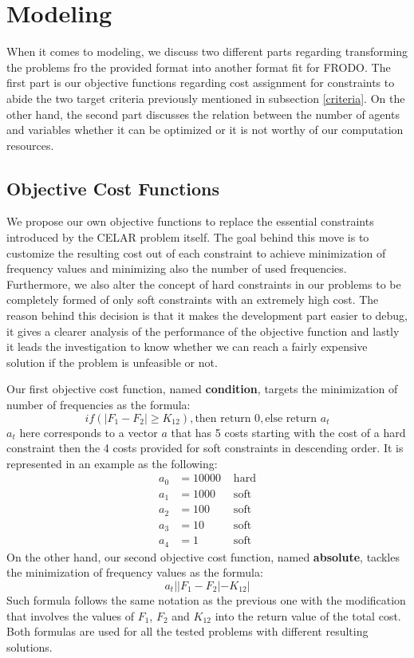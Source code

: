 \documentclass{article}
\begin{document}
	\section{Modeling}
	When it comes to modeling, we discuss two different parts regarding transforming the problems fro the provided format into another format fit for FRODO. The first part is our objective functions regarding cost assignment for constraints to abide the two target criteria previously mentioned in subsection \ref{criteria}. On the other hand, the second part discusses the relation between the number of agents and variables whether it can be optimized or it is not worthy of our computation resources.
	\subsection{Objective Cost Functions}\label{costfun}
	We propose our own objective functions to replace the essential constraints introduced by the CELAR problem itself. The goal behind this move is to customize the resulting cost out of each constraint to achieve minimization of frequency values and minimizing also the number of used frequencies. Furthermore, we also alter the concept of hard constraints in our problems to be completely formed of only soft constraints with an extremely high cost. The reason behind this decision is that it makes the development part easier to debug, it gives a clearer analysis of the performance of the objective function and lastly it leads the investigation to know whether we can reach a fairly expensive solution if the problem is unfeasible or not.
	
	Our first objective cost function, named \textbf{condition}, targets the minimization of number of frequencies as the formula:
	\[if(|F_1 - F_2| \geq K_{12}), \text{then return 0}, \text{else return } a_t\]
	$a_t$ here corresponds to a vector $a$ that has 5 costs starting with the cost of a hard constraint then the 4 costs provided for soft constraints in descending order. It is represented in an example as the following:
	\begin{align}
		a_0 &= 10000 &\text{ hard}\\
		a_1 &= 1000 &\text{ soft}\\
		a_2 &= 100 &\text{ soft}\\
		a_3 &= 10 &\text{ soft}\\
		a_4 &= 1 &\text{ soft}
	\end{align}
	On the other hand, our second objective cost function, named \textbf{absolute}, tackles the minimization of frequency values as the formula:
	\[a_t||F_1 - F_2| - K_{12}|\]
	Such formula follows the same notation as the previous one with the modification that involves the values of $F_1$, $F_2$ and $K_{12}$ into the return value of the total cost. Both formulas are used for all the tested problems with different resulting solutions.
\end{document}

